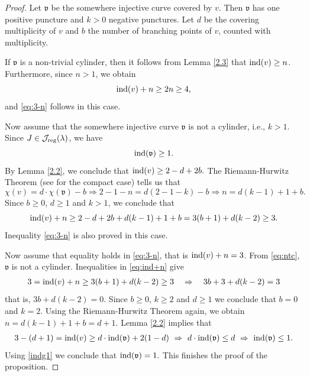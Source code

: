 \documentclass{amsart}
\newcommand{\ind}{\textnormal{ind}}
\begin{document}
\begin{proof}
Let $\mathfrak{v}$ be the somewhere injective curve covered by $v$. Then $\mathfrak{v}$ has one positive puncture and $k>0$ negative punctures. Let $d$ be the covering multiplicity of $v$ and $b$ the number of branching points of $v$, counted with multiplicity.

If $\mathfrak{v}$ is a non-trivial cylinder, then it follows from Lemma \ref{2.3} that $\ind(v) \geq n$. Furthermore, since $n>1$, we obtain
\begin{equation}\label{eq:ntc}
\ind(v)+n \geq 2n \geq 4,
\end{equation}
and \eqref{eq:3-n} follows in this case.

Now assume that the somewhere injective curve $\mathfrak{v}$ is not a cylinder, i.e., $k>1$. Since $J\in \mathcal{J}_{\rm reg}(\lambda)$, we have 
\begin{equation}\label{indg1}
\ind(\mathfrak{v}) \geq 1.
\end{equation}
By Lemma \ref{2.2}, we conclude that
$\ind(v) \geq 2-d+2b.$
The Riemann-Hurwitz Theorem (see \cite{Oort} for the compact case) tells us that
\begin{equation*}
\chi(v)=d \cdot \chi(\mathfrak{v})-b \Rightarrow 2-1-n=d(2-1-k)-b \Rightarrow n=d(k-1)+1 +b.
\end{equation*}
Since $b \geq 0$, $d \geq 1$ and $k>1$, we conclude that
\begin{equation}
  \ind(v)+n \geq 2-d+2b+d(k-1)+1+b
    = 3(b+1)+d(k-2)
    \geq 3.
  \label{eq:ind+n}
\end{equation}
Inequality \eqref{eq:3-n} is also proved in this case.
 
Now assume that equality holds in \eqref{eq:3-n}, that is $\ind(v) +n=3$. From \eqref{eq:ntc}, $\mathfrak{v}$ is not a cylinder. Inequalities in \eqref{eq:ind+n} give
\begin{eqnarray*}
3=\ind(v)+n \geq 3(b+1)+d(k-2) \geq 3 \quad \Rightarrow \quad 3b+3+d(k-2)=3
\end{eqnarray*}
that is,
$3b+d(k-2)=0.$
Since $b \geq 0$, $k \geq 2$ and $d \geq 1$ we conclude that $b=0$ and $k=2$. Using the Riemann-Hurwitz Theorem again, we obtain
$n=d(k-1)+1+b=d+1.
$
 Lemma \ref{2.2} implies that
\begin{eqnarray*}
 3-(d+1)=\ind(v) \geq d \cdot \ind(\mathfrak{v})+2(1-d)
\ \Rightarrow \ d \cdot \ind(\mathfrak{v}) \leq d 
\ \Rightarrow \  \ind(\mathfrak{v}) \leq 1.
\end{eqnarray*}
Using \eqref{indg1} we conclude that $\ind(\mathfrak{v})=1.$ This finishes the proof of the proposition.
\end{proof}
\end{document}
